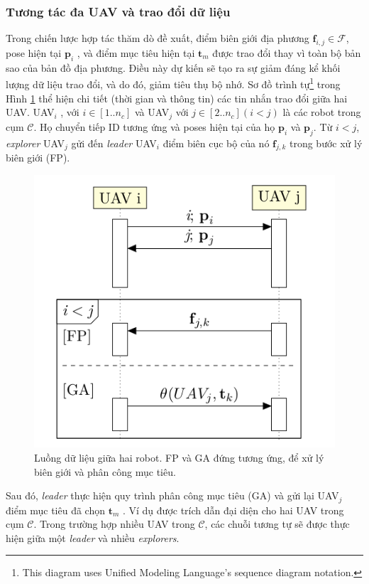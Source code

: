 \documentclass[11pt,openany]{book}
\begin{document}
\subsubsection{Tương tác đa UAV và trao đổi dữ liệu}
Trong chiến lược hợp tác thăm dò đề xuất, điểm biên giới địa phương $\mathbf{f}_{i,j} \in \mathcal{F}$, pose hiện tại $\mathbf{p}_i$ , và điểm mục tiêu hiện tại $\mathbf{t}_m$ được trao đổi thay vì toàn bộ bản sao của bản đồ địa phương. Điều này dự kiến sẽ tạo ra sự giảm đáng kể khối lượng dữ liệu trao đổi, và do đó, giảm tiêu thụ bộ nhớ. Sơ đồ trình tự\footnote{This diagram uses Unified Modeling Language's sequence diagram notation.} trong Hình \ref{fig:4.5} thể hiện chi tiết (thời gian và thông tin) các tin nhắn trao đổi giữa hai UAV. UAV$_i$ , với $i \in [1..n_c]$ và UAV$_j$ với $j \in [2..n_c] (i<j)$ là các robot trong cụm $\mathcal{C}$. Họ chuyển tiếp ID tương ứng và poses hiện tại của họ $\mathbf{p}_i$ và $\mathbf{p}_j$. Từ $i < j$, \textit{explorer} UAV$_j$ gửi đến \textit{leader} UAV$_i$ điểm biên cục bộ của nó $\mathbf{f}_{j,k}$ trong bước xử lý biên giới (FP).
\begin{figure}[H]
    \centering
    \includegraphics[scale=0.5]{assets/4_5.png}
    \caption{Luồng dữ liệu giữa hai robot. FP và GA đứng tương ứng, để xử lý biên giới và phân công mục tiêu.}
    \label{fig:4.5}
\end{figure}
Sau đó, \textit{leader} thực hiện quy trình phân công mục tiêu (GA) và gửi lại UAV$_j$ điểm mục tiêu đã chọn $\mathbf{t}_m$ . Ví dụ được trích dẫn đại diện cho hai UAV trong cụm $\mathcal{C}$. Trong trường hợp nhiều UAV trong $\mathcal{C}$, các chuỗi tương tự sẽ được thực hiện giữa một \textit{leader} và nhiều \textit{explorers}.
\end{document}
